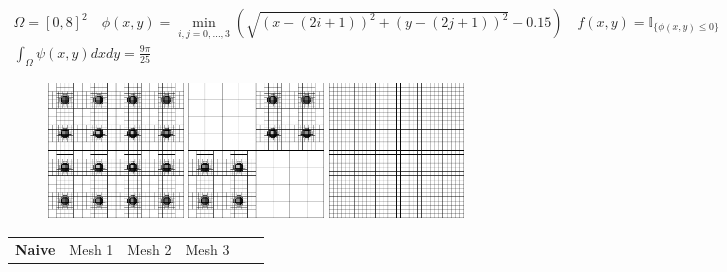 \documentclass[8pt]{beamer}
\begin{document}
\begin{frame}
\begin{footnotesize}
 \begin{gather*}
  \Omega = [0,8]^2 \quad \phi(x,y) = \min_{i,j=0,\dots,3} \left ( \sqrt{(x-(2i+1))^2 + (y-(2j+1))^2}-0.15\right ) \quad f(x,y) = \mathbb{I}_{\{ \phi(x,y) \leq 0\}} \\
  \int_{\Omega} \psi(x,y) dx dy = \frac{9 \pi}{25}
 \end{gather*}
\end{footnotesize}
 \begin{figure}[!h]
\begin{center}
\includegraphics[width=0.32\textwidth]{./figures/integrator/unif_1.pdf}
\includegraphics[width=0.32\textwidth]{./figures/integrator/unif_2.pdf}
\includegraphics[width=0.32\textwidth]{./figures/integrator/unif_3.pdf}
\end{center}
\end{figure}
\begin{footnotesize}
\begin{center}
\begin{tabular}{|c|c|c|c|c|c|c|c|c|} 
   \hline
    \textbf{Naive} & \multicolumn{2}{|c|}{Mesh 1} & \multicolumn{2}{|c|}{Mesh 2} & \multicolumn{2}{|c|}{Mesh 3}\\

\end{tabular}
\end{center}
\end{footnotesize}
\end{frame}
\end{document}

